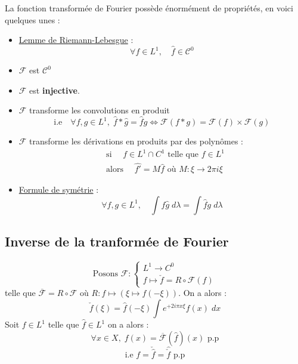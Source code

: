 \begin{prop}
    La fonction transformée de Fourier possède énormément de propriétés, en voici quelques unes :
    \begin{itemize}
        \item \underline{Lemme de Riemann-Lebesgue} :
            \[ \boxed{ \forall f \in L^1, \quad \hat{f} \in \mathcal{C}^0 } \]
       \item $\mathcal{F}$ est $\mathcal{C}^0$
       \item $\mathcal{F}$ est \textbf{injective}. 
       \item $\mathcal{F}$ transforme les convolutions en produit 
        \[ \boxed{ \text{i.e} \quad \forall f,g \in L^1, \; \hat{f} \ast \hat{g} = \hat{f} \hat{g} \iff \mathcal{F}(f \ast g) = \mathcal{F}(f) \times \mathcal{F}(g) }\] 
        \item $\mathcal{F}$ transforme les dérivations en produits par des polynômes : 
            \begin{align*}
                & \text{si } \quad f \in L^1 \cap C^1 \text{ telle que } f \in L^1 \\ 
                & \text{alors } \quad \widehat{f'} = M \hat{f} \text{ où } M : \xi \longrightarrow 2 \pi i \xi  
            \end{align*}
        \item \underline{Formule de symétrie} :
            \[ \forall f,g \in L^1, \quad \int f \hat{g} \; d \lambda = \int \hat{f} g \; d \lambda \] 
    \end{itemize}
\end{prop}

\subsection{Inverse de la tranformée de Fourier}

\begin{theorem}[Inversion]
        \[ \text{Posons } \mathcal{F} : 
            \begin{cases}
                L^1 \longrightarrow C^0  \\ 
                f \longmapsto \check{f} = R \circ \mathcal{F}(f)
            \end{cases}
        \] telle que $\overline{\mathcal{F}} = R \circ \mathcal{F}$
    où $R : f \longmapsto (\xi \mapsto f(-\xi))$. On a alors :
            \[ \boxed{ \check{f}(\xi) = \widehat{f}(-\xi) \int e^{+ 2i\pi x \xi } f(x) \; dx }\] 
    Soit $f \in L^1$ telle que $\hat{f} \in L^1$ on a alors : 
            \[  \forall x \in X, \; f(x) = \overline{\mathcal{F}}(\hat{f})(x) \text{ p.p} \]
            \[ \text{i.e } f = \check{\hat{f}} = \hat{\check{f}} \text{ p.p} \]
\end{theorem}

